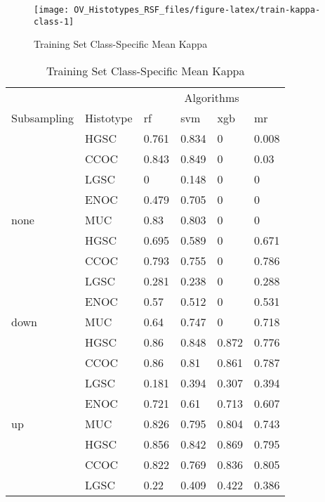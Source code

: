 \documentclass[
]{report}
\begin{document}
\begin{figure}[H]

{\centering \texttt{[image: OV\_Histotypes\_RSF\_files/figure-latex/train-kappa-class-1]} 

}

\caption{Training Set Class-Specific Mean Kappa}\label{fig:train-kappa-class}
\end{figure}

\begin{table}

\caption{\label{tab:train-kappa-class-table}Training Set Class-Specific Mean Kappa}
\centering
\begin{tabular}[t]{l|l|l|l|l|l}
\hline
\multicolumn{2}{c|}{ } & \multicolumn{4}{c}{Algorithms} \\
\cline{3-6}
Subsampling & Histotype & rf & svm & xgb & mr\\
\hline
 & HGSC & 0.761 & 0.834 & 0 & 0.008\\
\cline{2-6}
 & CCOC & 0.843 & 0.849 & 0 & 0.03\\
\cline{2-6}
 & LGSC & 0 & 0.148 & 0 & 0\\
\cline{2-6}
 & ENOC & 0.479 & 0.705 & 0 & 0\\
\cline{2-6}
\multirow{-5}{*}{\raggedright\arraybackslash none} & MUC & 0.83 & 0.803 & 0 & 0\\
\cline{1-6}
 & HGSC & 0.695 & 0.589 & 0 & 0.671\\
\cline{2-6}
 & CCOC & 0.793 & 0.755 & 0 & 0.786\\
\cline{2-6}
 & LGSC & 0.281 & 0.238 & 0 & 0.288\\
\cline{2-6}
 & ENOC & 0.57 & 0.512 & 0 & 0.531\\
\cline{2-6}
\multirow{-5}{*}{\raggedright\arraybackslash down} & MUC & 0.64 & 0.747 & 0 & 0.718\\
\cline{1-6}
 & HGSC & 0.86 & 0.848 & 0.872 & 0.776\\
\cline{2-6}
 & CCOC & 0.86 & 0.81 & 0.861 & 0.787\\
\cline{2-6}
 & LGSC & 0.181 & 0.394 & 0.307 & 0.394\\
\cline{2-6}
 & ENOC & 0.721 & 0.61 & 0.713 & 0.607\\
\cline{2-6}
\multirow{-5}{*}{\raggedright\arraybackslash up} & MUC & 0.826 & 0.795 & 0.804 & 0.743\\
\cline{1-6}
 & HGSC & 0.856 & 0.842 & 0.869 & 0.795\\
\cline{2-6}
 & CCOC & 0.822 & 0.769 & 0.836 & 0.805\\
\cline{2-6}
 & LGSC & 0.22 & 0.409 & 0.422 & 0.386\\

\end{tabular}
\end{table}
\end{document}
